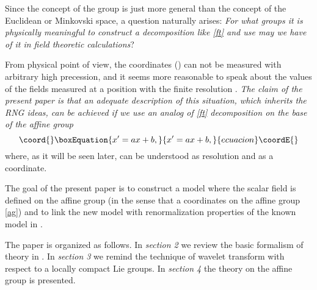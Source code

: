 \documentclass[a4paper,a4paper]{article}
\providecommand{\R}{\mathbb{R}}
\begin{document}
Since the concept of the group is just more general than the concept 
of the Euclidean or Minkovski space, a question naturally arises: {\em For 
what groups it is physically meaningful to construct a decomposition 
like \eqref{ft} and use may we have of it in field theoretic calculations}?

From physical point of view, the coordinates (\coordHE{}) can not be measured with 
arbitrary high precession, and it seems more reasonable to speak about 
the values of the fields  \myHighlight{$\phi^\alpha$}\coordHE{} measured at a position \coordHE{} with 
the finite resolution \coordHE{}. {\em The claim of the present paper is 
that an adequate description of this situation, which inherits the 
RNG ideas, can be achieved if 
we use an analog of \eqref{ft} decomposition on the base of the affine 
group}
\begin{equation}\coord{}\boxEquation{
x' = a x + b
\label{ag}, 
}{
x' = a x + b
, 
}{ecuacion}\coordE{}\end{equation} 
where, as it will be seen later, \coordHE{} can be understood as resolution and 
\coordHE{} as a coordinate. 

The goal of the present paper is to construct a \coordHE{} model where the 
scalar field \coordHE{} is defined on the affine group (in the sense 
that \coordHE{} a coordinates on the affine group \eqref{ag}) and to link 
the new model with renormalization properties of the known \coordHE{} model 
in \myHighlight{$\R^n$}\coordHE{}. 

The paper is organized as follows. In {\em section 2} we review the basic 
formalism of \coordHE{} theory in \myHighlight{$\R^n$}\coordHE{}. In {\em section 3} we remind the 
technique of wavelet transform with respect to a locally compact Lie groups. 
In {\em section 4} the \coordHE{} theory on the affine group is presented. 
 
\end{document}
